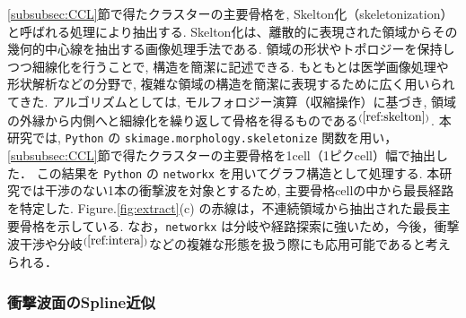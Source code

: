 \documentclass[a4j]{jarticle}
\begin{document}
\ref{subsubsec:CCL}節で得たクラスターの主要骨格を, Skelton化（skeletonization）と呼ばれる処理により抽出する.
Skelton化は、離散的に表現された領域からその幾何的中心線を抽出する画像処理手法である. 
領域の形状やトポロジーを保持しつつ細線化を行うことで, 構造を簡潔に記述できる.
もともとは医学画像処理や形状解析などの分野で, 複雑な領域の構造を簡潔に表現するために広く用いられてきた.
アルゴリズムとしては, モルフォロジー演算（収縮操作）に基づき, 領域の外縁から内側へと細線化を繰り返して骨格を得るものである$^{(\ref{ref:skelton})}$.
本研究では, \texttt{Python} の \texttt{skimage.morphology.skeletonize} 関数を用い，\ref{subsubsec:CCL}節で得たクラスターの主要骨格を1cell（1ピクcell）幅で抽出した．
この結果を \texttt{Python} の \texttt{networkx} を用いてグラフ構造として処理する.
本研究では干渉のない1本の衝撃波を対象とするため, 主要骨格cellの中から最長経路を特定した.
Figure.\ref{fig:extract}(c) の赤線は，不連続領域から抽出された最長主要骨格を示している.
なお，\texttt{networkx} は分岐や経路探索に強いため，今後，衝撃波干渉や分岐$^{(\ref{ref:intera})}$などの複雑な形態を扱う際にも応用可能であると考えられる．

\subsubsection{衝撃波面のSpline近似} \label{subsubsec:spline}
\mbox{}\\[-1.0ex]
\end{document}
